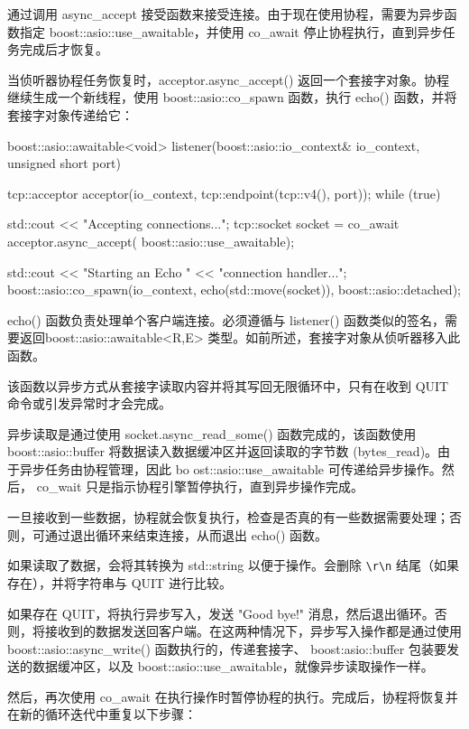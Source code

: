 通过调用 async\_accept 接受函数来接受连接。由于现在使用协程，需要为异步函数指定 boost::asio::use\_awaitable，并使用 co\_await 停止协程执行，直到异步任务完成后才恢复。

当侦听器协程任务恢复时，acceptor.async\_accept() 返回一个套接字对象。协程继续生成一个新线程，使用 boost::asio::co\_spawn 函数，执行 echo() 函数，并将套接字对象传递给它：

\begin{cpp}
boost::asio::awaitable<void> listener(boost::asio::io_context& io_context, unsigned short port) {
    tcp::acceptor acceptor(io_context,
                           tcp::endpoint(tcp::v4(), port));
    while (true) {
        std::cout << "Accepting connections...\n";
        tcp::socket socket = co_await
            acceptor.async_accept(
                boost::asio::use_awaitable);

        std::cout << "Starting an Echo "
                  << "connection handler...\n";
        boost::asio::co_spawn(io_context,
                              echo(std::move(socket)),
                              boost::asio::detached);
    }
}
\end{cpp}

echo() 函数负责处理单个客户端连接。必须遵循与 listener() 函数类似的签名，需要返回boost::asio::awaitable<R,E> 类型。如前所述，套接字对象从侦听器移入此函数。

该函数以异步方式从套接字读取内容并将其写回无限循环中，只有在收到 QUIT 命令或引发异常时才会完成。

异步读取是通过使用 socket.async\_read\_some() 函数完成的，该函数使用 boost::asio::buffer 将数据读入数据缓冲区并返回读取的字节数 (bytes\_read)。由于异步任务由协程管理，因此 bo ost::asio::use\_awaitable 可传递给异步操作。然后， co\_wait 只是指示协程引擎暂停执行，直到异步操作完成。

一旦接收到一些数据，协程就会恢复执行，检查是否真的有一些数据需要处理；否则，可通过退出循环来结束连接，从而退出 echo() 函数。

如果读取了数据，会将其转换为 std::string 以便于操作。会删除 \verb|\r\n| 结尾（如果存在），并将字符串与 QUIT 进行比较。

如果存在 QUIT，将执行异步写入，发送 "Good bye!" 消息，然后退出循环。否则，将接收到的数据发送回客户端。在这两种情况下，异步写入操作都是通过使用 boost::asio::async\_write() 函数执行的，传递套接字、 boost:asio::buffer 包装要发送的数据缓冲区，以及 boost::asio::use\_awaitable，就像异步读取操作一样。

然后，再次使用 co\_await 在执行操作时暂停协程的执行。完成后，协程将恢复并在新的循环迭代中重复以下步骤：

